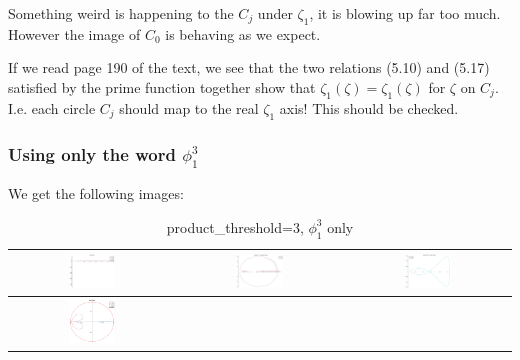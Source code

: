 \documentclass[a4paper,10pt]{article}
\begin{document}
 Something weird is happening to the $C_j$ under $\zeta_1$, it is blowing up far too much. However the image of $C_0$ is behaving as we expect. 
 
 If we read page 190 of the text, we see that the two relations (5.10) and (5.17) satisfied by the prime function together show that $\zeta_1(\zeta) = \zeta_1(\zeta)$ for $\zeta$ on $C_j$. I.e. each circle $C_j$ should map to the real $\zeta_1$ axis! This should be checked.
 
 \subsubsection{Using only the word $\phi_1^3$}
 We get the following images:
 \begin{table}[!ht]
 \caption{product\_threshold=3, $\phi_1^3$ only}
 \begin{tabular}{|c|c|c|}
  \hline
  \includegraphics[width=0.3\textwidth]{PT_3_z1_1-3.png} &
  \includegraphics[width=0.3\textwidth]{PT_3_C1z1_1-3.png} &
  \includegraphics[width=0.3\textwidth]{PT_3_C2z1_1-3.png} \\ \hline
  \includegraphics[width=0.3\textwidth]{PT_3_z2_1-3.png} &

\end{tabular}
\end{table}
\end{document}
